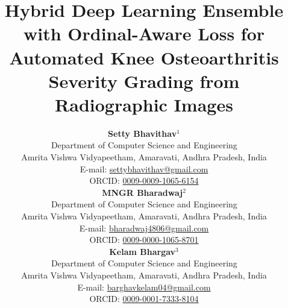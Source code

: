 \documentclass[10pt,journal]{IEEEtran}
\begin{document}
\title{Hybrid Deep Learning Ensemble with Ordinal-Aware Loss for Automated Knee Osteoarthritis Severity Grading from Radiographic Images}

\author{
\begin{minipage}[t]{0.31\textwidth}
\centering
\textbf{Setty Bhavithav}$^{1}$\\
$^{}$Department of Computer Science and Engineering\\
Amrita Vishwa Vidyapeetham, Amaravati, Andhra Pradesh, India\\
E-mail: \href{mailto:settybhavithav@gmail.com}{settybhavithav@gmail.com}\\
ORCID: \href{https://orcid.org/0009-0009-1065-6154}{0009-0009-1065-6154}
\end{minipage}
\hfill
\begin{minipage}[t]{0.31\textwidth}
\centering
\textbf{MNGR Bharadwaj}$^{2}$\\
$^{}$Department of Computer Science and Engineering\\
Amrita Vishwa Vidyapeetham, Amaravati, Andhra Pradesh, India\\
E-mail: \href{mailto:bharadwaj4806@gmail.com}{bharadwaj4806@gmail.com}\\
ORCID: \href{https://orcid.org/0009-0000-1065-8701}{0009-0000-1065-8701}
\end{minipage}
\hfill
\begin{minipage}[t]{0.31\textwidth}
\centering
\textbf{Kelam Bhargav}$^{3}$\\
$^{}$Department of Computer Science and Engineering\\
Amrita Vishwa Vidyapeetham, Amaravati, Andhra Pradesh, India\\
E-mail: \href{mailto:barghavkelam04@gmail.com}{barghavkelam04@gmail.com}\\
ORCID: \href{https://orcid.org/0009-0001-7333-8104}{0009-0001-7333-8104}
\end{minipage}
}

\maketitle
\end{document}
